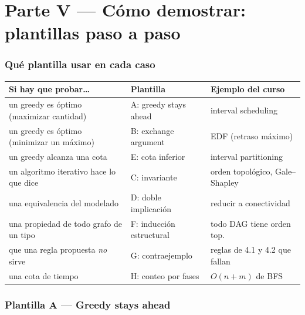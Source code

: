 \documentclass[11pt,a4paper]{article}
\theoremstyle{plain}
\theoremstyle{definition}
\theoremstyle{remark}
\begin{document}
\part*{Parte V --- Cómo demostrar: plantillas paso a paso}

\section{Qué plantilla usar en cada caso}

\begin{center}\small
\begin{tabular}{@{}lll@{}}
\toprule
\textbf{Si hay que probar\dots} & \textbf{Plantilla} & \textbf{Ejemplo del curso} \\
\midrule
un greedy es óptimo (maximizar cantidad) & A: greedy stays ahead & interval scheduling \\
un greedy es óptimo (minimizar un máximo) & B: exchange argument & EDF (retraso máximo) \\
un greedy alcanza una cota & E: cota inferior & interval partitioning \\
un algoritmo iterativo hace lo que dice & C: invariante & orden topológico, Gale--Shapley \\
una equivalencia del modelado & D: doble implicación & reducir a conectividad \\
una propiedad de todo grafo de un tipo & F: inducción estructural & todo DAG tiene orden top. \\
que una regla propuesta \emph{no} sirve & G: contraejemplo & reglas de 4.1 y 4.2 que fallan \\
una cota de tiempo & H: conteo por fases & $O(n+m)$ de BFS \\
\bottomrule
\end{tabular}
\end{center}

\section{Plantilla A --- Greedy stays ahead}
\end{document}
